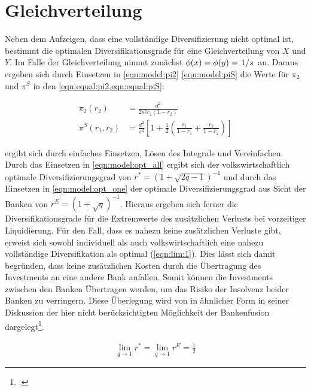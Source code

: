 \section{Gleichverteilung}%
\label{sec:div:equal}

Neben dem Aufzeigen, dass eine vollständige Diversifizierung nicht optimal ist, bestimmt \citeauthor{Wagner-2010} die optimalen Diversifikationsgrade für eine Gleichverteilung von $X$ und $Y$. Im Falle der Gleichverteilung nimmt  \citeauthor{Wagner-2010} zunächst $\phi(x) = \phi(y) = \flatfrac{1}{s}$ an. Daraus ergeben sich durch Einsetzen in \cref{eqn:model:pi2} \bzw{} \cref{eqn:model:piS} die Werte für $\pi_2$ und $\pi^S$ in den \cref{eqn:equal:pi2,eqn:equal:piS}:

\begin{align}
	\pi_2(r_2)     & = \frac{d^2}{2s^2r_2(1-r_2)}			                                                                \label{eqn:equal:pi2}          \\
	\pi^S(r_1,r_2) & = \frac{d^2}{s^2}	\left[ 1 + \frac{1}{2} \left( \frac{r_1}{1-r_1} + \frac{r_2}{1-r_2} \right) \right] \label{eqn:equal:piS}
\end{align}

 ergibt sich durch einfaches Einsetzen, Lösen des Integrals und Vereinfachen. Durch das Einsetzen in \cref{eqn:model:opt_all} ergibt sich der volkswirtschaftlich optimale Diversifizierungsgrad von $r^\ast = \left(1 + \sqrt{2q-1} \right)^{-1}$ und durch das Einsetzen in \cref{eqn:model:opt_one} der optimale Diversifizierungsgrad aus Sicht der Banken von $r^E = (1+\sqrt{q})^{-1}$. Hieraus ergeben sich ferner die Diversifikationsgrade für die Extremwerte des zusätzlichen Verlusts bei vorzeitiger Liquidierung. Für den Fall, dass es nahezu keine zusätzlichen Verluste gibt, erweist sich sowohl individuell als auch volkswirtschaftlich eine nahezu vollständige Diversifikation als optimal (\cref{eqn:lim:1}). Dies lässt sich damit begründen, dass keine zusätzlichen Kosten durch die Übertragung des Investments an eine andere Bank anfallen. Somit können die Investments zwischen den Banken Übertragen werden, um das Risiko der Insolvenz beider Banken zu verringern. Diese Überlegung wird von \citeauthor{Wagner-2010} in ähnlicher Form in seiner Diskussion der hier nicht berücksichtigten Möglichkeit der Bankenfusion dargelegt\footcite[\vgl{}][\pno~381(9)]{Wagner-2010}.

\begin{align}
	\lim_{q\to1} r^\ast = \lim_{q\to1} r^E = \frac{1}{2} 	\label{eqn:lim:1}
\end{align}

